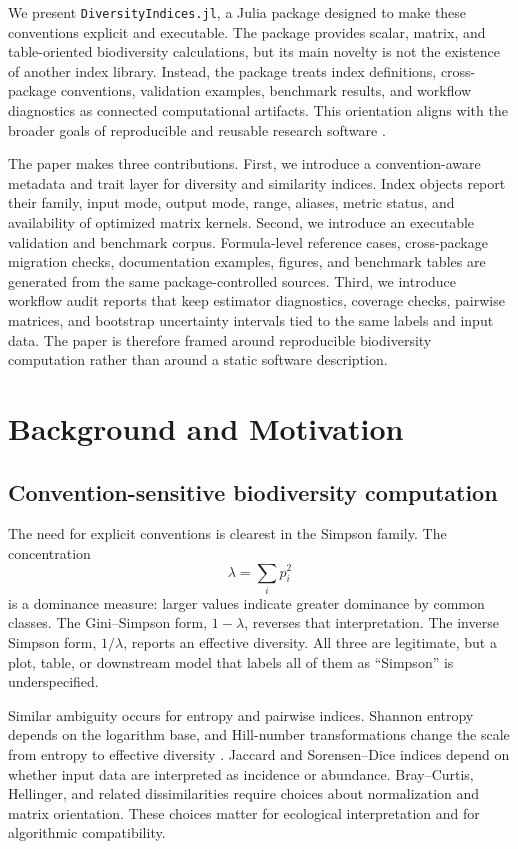 \documentclass[preprint,12pt,authoryear]{elsarticle}
\begin{document}
We present \texttt{DiversityIndices.jl}, a Julia package designed to make
these conventions explicit and executable.  The package provides scalar,
matrix, and table-oriented biodiversity calculations, but its main novelty is
not the existence of another index library.  Instead, the package treats
index definitions, cross-package conventions, validation examples, benchmark
results, and workflow diagnostics as connected computational artifacts.
This orientation aligns with the broader goals of reproducible and reusable
research software \citep{peng2011reproducible,wilkinson2016fair}.

The paper makes three contributions.  First, we introduce a convention-aware
metadata and trait layer for diversity and similarity indices.  Index objects
report their family, input mode, output mode, range, aliases, metric status,
and availability of optimized matrix kernels.  Second, we introduce an
executable validation and benchmark corpus.  Formula-level reference cases,
cross-package migration checks, documentation examples, figures, and
benchmark tables are generated from the same package-controlled sources.
Third, we introduce workflow audit reports that keep estimator diagnostics,
coverage checks, pairwise matrices, and bootstrap uncertainty intervals tied
to the same labels and input data.  The paper is therefore framed around
reproducible biodiversity computation rather than around a static software
description.

\section{Background and Motivation}

\subsection{Convention-sensitive biodiversity computation}

The need for explicit conventions is clearest in the Simpson family.  The
concentration
\[
  \lambda = \sum_i p_i^2
\]
is a dominance measure: larger values indicate greater dominance by common
classes.  The Gini--Simpson form, \(1-\lambda\), reverses that interpretation.
The inverse Simpson form, \(1/\lambda\), reports an effective diversity.  All
three are legitimate, but a plot, table, or downstream model that labels all
of them as ``Simpson'' is underspecified.

Similar ambiguity occurs for entropy and pairwise indices.  Shannon entropy
depends on the logarithm base, and Hill-number transformations change the
scale from entropy to effective diversity \citep{hill1973diversity,
jost2006entropy}.  Jaccard and Sorensen--Dice indices depend on whether input
data are interpreted as incidence or abundance.  Bray--Curtis, Hellinger, and
related dissimilarities require choices about normalization and matrix
orientation.  These choices matter for ecological interpretation and for
algorithmic compatibility.
\end{document}
